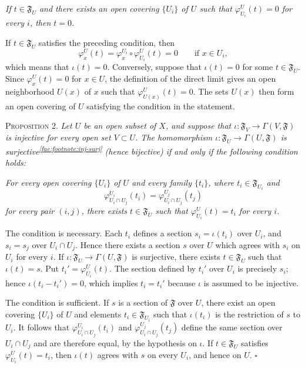 \textit{If $t\in\mathfrak{F}_U$ and there exists an open covering $\{U_i\}$ of $U$ such that $\varphi_{U_i}^U(t)=0$ for every $i$, then $t=0$.}

If $t\in\mathfrak{F}_U$ satisfies the preceding condition, then
\begin{equation*}
\varphi_x^U(t)=\varphi_x^{U_i}\circ\varphi_{U_i}^U(t)=0
\qquad\text{if }x\in U_i,
\end{equation*}
which means that $\iota(t)=0$. Conversely, suppose that $\iota(t)=0$ for some $t\in\mathfrak{F}_U$. Since $\varphi_x^U(t)=0$ for $x\in U$, the definition of the direct limit gives an open neighborhood $U(x)$ of $x$ such that $\varphi_{U(x)}^U(t)=0$. The sets $U(x)$ then form an open covering of $U$ satisfying the condition in the statement.

\medskip
{}\label{fac:I:1:no:3:prop:2}
\textsc{Proposition 2.} \textit{Let $U$ be an open subset of $X$, and suppose that $\iota:\mathfrak{F}_V\to\Gamma(V,\mathfrak{F})$ is injective for every open set $V\subset U$. The homomorphism $\iota:\mathfrak{F}_U\to\Gamma(U,\mathfrak{F})$ is surjective\textsuperscript{\ref{fac:footnote:inj-surj}} (hence bijective) if and only if the following condition holds:}

\textit{For every open covering $\{U_i\}$ of $U$ and every family $\{t_i\}$, where $t_i\in\mathfrak{F}_{U_i}$ and}
\begin{equation*}
\varphi_{U_i\cap U_j}^{U_i}(t_i)=\varphi_{U_i\cap U_j}^{U_j}(t_j)
\end{equation*}
\textit{for every pair $(i,j)$, there exists $t\in\mathfrak{F}_U$ such that $\varphi_{U_i}^{U}(t)=t_i$ for every $i$.}

The condition is necessary. Each $t_i$ defines a section $s_i=\iota(t_i)$ over $U_i$, and $s_i=s_j$ over $U_i\cap U_j$. Hence there exists a section $s$ over $U$ which agrees with $s_i$ on $U_i$ for every $i$. If $\iota:\mathfrak{F}_U\to\Gamma(U,\mathfrak{F})$ is surjective, there exists $t\in\mathfrak{F}_U$ such that $\iota(t)=s$. Put $t_i'=\varphi_{U_i}^{U}(t)$. The section defined by $t_i'$ over $U_i$ is precisely $s_i$; hence $\iota(t_i-t_i')=0$, which implies $t_i=t_i'$ because $\iota$ is assumed to be injective.

The condition is sufficient. If $s$ is a section of $\mathfrak{F}$ over $U$, there exist an open covering $\{U_i\}$ of $U$ and elements $t_i\in\mathfrak{F}_{U_i}$ such that $\iota(t_i)$ is the restriction of $s$ to $U_i$. It follows that $\varphi_{U_i\cap U_j}^{U_i}(t_i)$ and $\varphi_{U_i\cap U_j}^{U_j}(t_j)$ define the same section over $U_i\cap U_j$ and are therefore equal, by the hypothesis on $\iota$. If $t\in\mathfrak{F}_U$ satisfies $\varphi_{U_i}^{U}(t)=t_i$, then $\iota(t)$ agrees with $s$ on every $U_i$, and hence on $U$. \hfill$\square$

